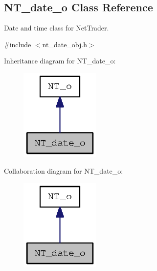 \subsection{NT\_\-date\_\-o Class Reference}
\label{class_n_t__date__o}


Date and time class for NetTrader.  




{\ttfamily \#include $<$nt\_\-date\_\-obj.h$>$}



Inheritance diagram for NT\_\-date\_\-o:
\nopagebreak
\begin{figure}[H]
\begin{center}
\leavevmode
\includegraphics[width=112pt]{class_n_t__date__o__inherit__graph}
\end{center}
\end{figure}


Collaboration diagram for NT\_\-date\_\-o:
\nopagebreak
\begin{figure}[H]
\begin{center}
\leavevmode
\includegraphics[width=112pt]{class_n_t__date__o__coll__graph}
\end{center}
\end{figure}
